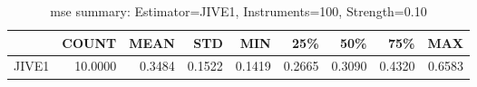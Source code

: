 \begin{table}[ht]
\centering
\caption{mse summary: Estimator=JIVE1, Instruments=100, Strength=0.10}
\begin{tabular}{lrrrrrrrr}
\toprule
 & COUNT & MEAN & STD & MIN & 25\% & 50\% & 75\% & MAX \\
\midrule
JIVE1 & 10.0000 & 0.3484 & 0.1522 & 0.1419 & 0.2665 & 0.3090 & 0.4320 & 0.6583 \\
\bottomrule
\end{tabular}
\end{table}
